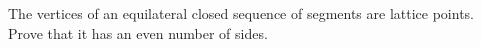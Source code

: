 The vertices of an equilateral closed sequence of segments are lattice points. Prove that it has an even number of sides.
